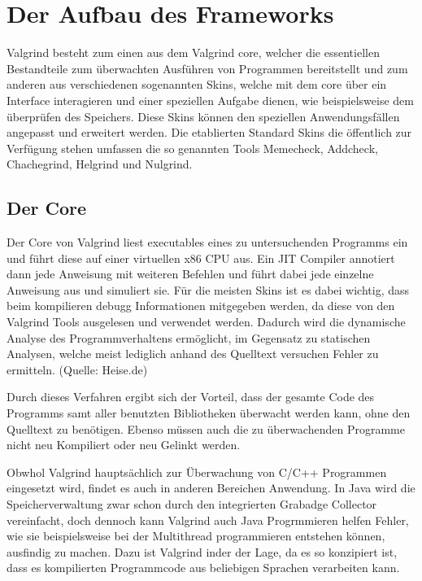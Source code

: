\section{Der Aufbau des Frameworks}
Valgrind besteht zum einen aus dem Valgrind core, welcher die essentiellen Bestandteile zum überwachten Ausführen von Programmen bereitstellt und zum anderen aus verschiedenen sogenannten Skins, welche mit dem core über ein Interface interagieren und einer speziellen Aufgabe dienen, wie beispielsweise dem überprüfen des Speichers. Diese Skins können den speziellen Anwendungsfällen angepasst und erweitert werden. Die etablierten Standard Skins die öffentlich zur Verfügung stehen umfassen die so genannten Tools Memecheck, Addcheck, Chachegrind, Helgrind und Nulgrind.

\subsection{Der Core}
Der Core von Valgrind liest executables eines zu untersuchenden Programms ein und führt diese auf einer virtuellen x86 CPU aus. Ein JIT Compiler annotiert dann jede Anweisung mit weiteren Befehlen und führt dabei jede einzelne Anweisung aus und simuliert sie. Für die meisten Skins ist es dabei wichtig, dass beim kompilieren debugg Informationen mitgegeben werden, da diese von den Valgrind Tools ausgelesen und verwendet werden. Dadurch wird die dynamische Analyse des Programmverhaltens ermöglicht, im Gegensatz zu statischen Analysen, welche meist lediglich anhand des Quelltext versuchen Fehler zu ermitteln. (Quelle: Heise.de)

Durch dieses Verfahren ergibt sich der Vorteil, dass der gesamte Code des Programms samt aller benutzten Bibliotheken überwacht werden kann, ohne den Quelltext zu benötigen.
Ebenso müssen auch die zu überwachenden Programme nicht neu Kompiliert oder neu Gelinkt werden.\cite{valarticle}

Obwhol Valgrind hauptsächlich zur Überwachung von C/C++ Programmen eingesetzt wird, findet es auch in anderen Bereichen Anwendung. In Java wird die Speicherverwaltung zwar schon durch den integrierten Grabadge Collector vereinfacht, doch dennoch kann Valgrind auch Java Progrmmieren helfen Fehler, wie sie beispielsweise bei der Multithread programmieren entstehen können, ausfindig zu machen. Dazu ist Valgrind inder der Lage, da es so konzipiert ist, dass es kompilierten Programmcode aus beliebigen Sprachen verarbeiten kann.